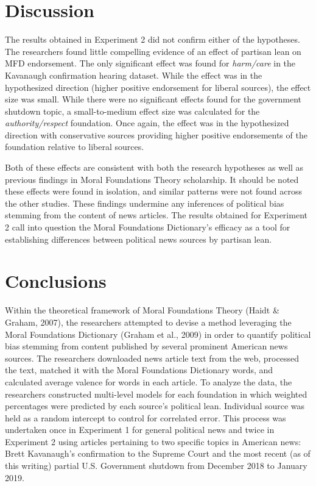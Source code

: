 \documentclass[english,,man]{apa6}
\begin{document}
\section{Discussion}\label{discussion-1}

The results obtained in Experiment 2 did not confirm either of the
hypotheses. The researchers found little compelling evidence of an
effect of partisan lean on MFD endorsement. The only significant effect
was found for \emph{harm/care} in the Kavanaugh confirmation hearing
dataset. While the effect was in the hypothesized direction (higher
positive endorsement for liberal sources), the effect size was small.
While there were no significant effects found for the government
shutdown topic, a small-to-medium effect size was calculated for the
\emph{authority/respect} foundation. Once again, the effect was in the
hypothesized direction with conservative sources providing higher
positive endorsements of the foundation relative to liberal sources.

Both of these effects are consistent with both the research hypotheses
as well as previous findings in Moral Foundations Theory scholarship. It
should be noted these effects were found in isolation, and similar
patterns were not found across the other studies. These findings
undermine any inferences of political bias stemming from the content of
news articles. The results obtained for Experiment 2 call into question
the Moral Foundations Dictionary's efficacy as a tool for establishing
differences between political news sources by partisan lean.

\section{Conclusions}\label{conclusions}

Within the theoretical framework of Moral Foundations Theory (Haidt \&
Graham, 2007), the researchers attempted to devise a method leveraging
the Moral Foundations Dictionary (Graham et al., 2009) in order to
quantify political bias stemming from content published by several
prominent American news sources. The researchers downloaded news article
text from the web, processed the text, matched it with the Moral
Foundations Dictionary words, and calculated average valence for words
in each article. To analyze the data, the researchers constructed
multi-level models for each foundation in which weighted percentages
were predicted by each source's political lean. Individual source was
held as a random intercept to control for correlated error. This process
was undertaken once in Experiment 1 for general political news and twice
in Experiment 2 using articles pertaining to two specific topics in
American news: Brett Kavanaugh's confirmation to the Supreme Court and
the most recent (as of this writing) partial U.S. Government shutdown
from December 2018 to January 2019.
\end{document}
